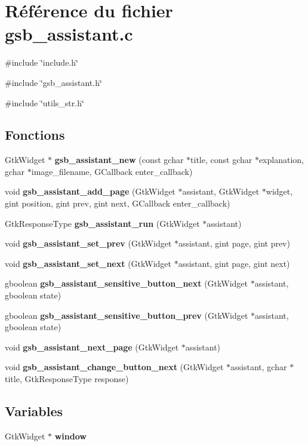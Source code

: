 \section{Référence du fichier gsb\_\-assistant.c}
\label{gsb__assistant_8c}
{\ttfamily \#include \char`\"{}include.h\char`\"{}}\par
{\ttfamily \#include \char`\"{}gsb\_\-assistant.h\char`\"{}}\par
{\ttfamily \#include \char`\"{}utils\_\-str.h\char`\"{}}\par
\subsection*{Fonctions}
\begin{DoxyCompactItemize}
\item 
GtkWidget $\ast$ {\bf gsb\_\-assistant\_\-new} (const gchar $\ast$title, const gchar $\ast$explanation, gchar $\ast$image\_\-filename, GCallback enter\_\-callback)
\item 
void {\bf gsb\_\-assistant\_\-add\_\-page} (GtkWidget $\ast$assistant, GtkWidget $\ast$widget, gint position, gint prev, gint next, GCallback enter\_\-callback)
\item 
GtkResponseType {\bf gsb\_\-assistant\_\-run} (GtkWidget $\ast$assistant)
\item 
void {\bf gsb\_\-assistant\_\-set\_\-prev} (GtkWidget $\ast$assistant, gint page, gint prev)
\item 
void {\bf gsb\_\-assistant\_\-set\_\-next} (GtkWidget $\ast$assistant, gint page, gint next)
\item 
gboolean {\bf gsb\_\-assistant\_\-sensitive\_\-button\_\-next} (GtkWidget $\ast$assistant, gboolean state)
\item 
gboolean {\bf gsb\_\-assistant\_\-sensitive\_\-button\_\-prev} (GtkWidget $\ast$assistant, gboolean state)
\item 
void {\bf gsb\_\-assistant\_\-next\_\-page} (GtkWidget $\ast$assistant)
\item 
void {\bf gsb\_\-assistant\_\-change\_\-button\_\-next} (GtkWidget $\ast$assistant, gchar $\ast$title, GtkResponseType response)
\end{DoxyCompactItemize}
\subsection*{Variables}
\begin{DoxyCompactItemize}
\item 
GtkWidget $\ast$ {\bf window}
\end{DoxyCompactItemize}


